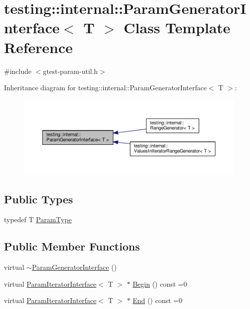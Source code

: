 \hypertarget{classtesting_1_1internal_1_1ParamGeneratorInterface}{}\section{testing\+:\+:internal\+:\+:Param\+Generator\+Interface$<$ T $>$ Class Template Reference}
\label{classtesting_1_1internal_1_1ParamGeneratorInterface}


{\ttfamily \#include $<$gtest-\/param-\/util.\+h$>$}



Inheritance diagram for testing\+:\+:internal\+:\+:Param\+Generator\+Interface$<$ T $>$\+:\nopagebreak
\begin{figure}[H]
\begin{center}
\leavevmode
\includegraphics[width=350pt]{classtesting_1_1internal_1_1ParamGeneratorInterface__inherit__graph}
\end{center}
\end{figure}
\subsection*{Public Types}
\begin{DoxyCompactItemize}
\item 
typedef T \hyperlink{classtesting_1_1internal_1_1ParamGeneratorInterface_ab33d2ea424c50beaf503cb125b3cd003}{Param\+Type}
\end{DoxyCompactItemize}
\subsection*{Public Member Functions}
\begin{DoxyCompactItemize}
\item 
virtual \hyperlink{classtesting_1_1internal_1_1ParamGeneratorInterface_ac2767cb9ad2e292e291c4903323c6eff}{$\sim$\+Param\+Generator\+Interface} ()
\item 
virtual \hyperlink{classtesting_1_1internal_1_1ParamIteratorInterface}{Param\+Iterator\+Interface}$<$ T $>$ $\ast$ \hyperlink{classtesting_1_1internal_1_1ParamGeneratorInterface_ae1de83b16fe9a53c67778a026c6a9569}{Begin} () const =0
\item 
virtual \hyperlink{classtesting_1_1internal_1_1ParamIteratorInterface}{Param\+Iterator\+Interface}$<$ T $>$ $\ast$ \hyperlink{classtesting_1_1internal_1_1ParamGeneratorInterface_afa7211b74990e11d3fc7ad4e7113da4f}{End} () const =0
\end{DoxyCompactItemize}


